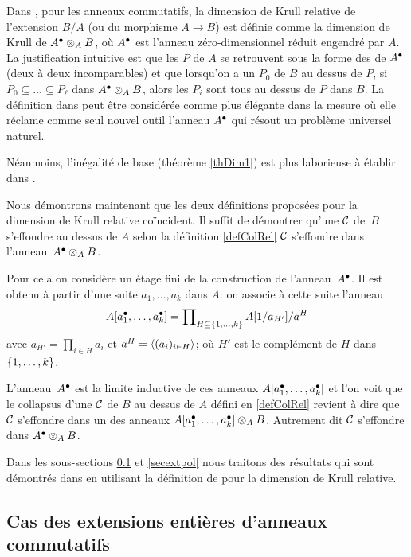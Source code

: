 Dans \cite{ACMC}, pour les anneaux commutatifs,  la dimension de Krull relative de l'extension $B/A$ (ou du morphisme $A\to B$) est définie comme la dimension de Krull de $A^\bullet\otimes_A B$, où $A^\bullet$ est l'anneau zéro-dimensionnel réduit engendré par $A$. La justification intuitive est que les \ideps $P$ de $A$ se retrouvent sous la forme des \idemas de $A^\bullet$ (deux à deux incomparables) et que lorsqu'on a un \idep $P_0$ de $B$ au dessus de $P$, \hbox{si $P_0\subseteq \dots \subseteq P_\ell$} dans $A^\bullet\otimes_A B$, alors les $P_i$ sont tous au dessus de $P$ dans $B$. La définition dans \cite{ACMC} peut être considérée comme plus élégante dans la mesure où elle réclame comme seul nouvel outil l'anneau $A^\bullet$ qui résout un problème universel naturel. 

Néanmoins, l'inégalité de base (théorème \ref{thDim1}) est plus laborieuse à établir dans \cite{ACMC}.

\medskip Nous démontrons maintenant que les deux définitions \covs proposées pour la dimension de Krull relative coïncident.
Il suffit de démontrer qu'une \proc ${\cal C}$ de~$B$ s'effondre au dessus de $A$ selon la définition  \ref{defColRel} \ssi ${\cal C}$ s'effondre dans l'anneau~\hbox{$A^\bullet\otimes _A B$}.

Pour cela on considère un étage fini de la construction de l'anneau~$A^\bullet$.
Il est obtenu à partir d'une suite $a_1,\dots,a_k$ dans $A$: on  associe à cette suite l'anneau
$$
A[a_1^\bullet,\dots,a_k^\bullet]=\prod\nolimits_{H\subseteq \{1,\dots,k\}} A[1/a_{H'}]/a^{H}
$$
avec $a_{H'}=\prod_{i\in H}a_i$ et $a^{H}=\left\langle{(a_i)_{i\in H}}\right\rangle$; où $H'$
est le complément de $H$ dans $\{1,\dots,k\}$.


L'anneau~$A^\bullet$ est la limite inductive de ces anneaux $A[a_1^\bullet,\dots,a_k^\bullet]$
et l'on voit que le collapsus d'une \proc ${\cal C}$ de $B$ au dessus de $A$
défini en \ref{defColRel}
revient à dire que ${\cal C}$ s'effondre dans un des anneaux $A[a_1^\bullet,\dots,a_k^\bullet]\otimes_A B$. Autrement dit ${\cal C}$ s'effondre dans 
$A^\bullet\otimes _A B$.

 

Dans les sous-sections \ref{secextent} et \ref{secextpol} nous traitons des résultats qui sont démontrés dans \cite{ACMC} en utilisant la définition de \cite{ACMC} pour la dimension de Krull relative.

\subsection{Cas des extensions entières d'anneaux commutatifs}\label{secextent} 

